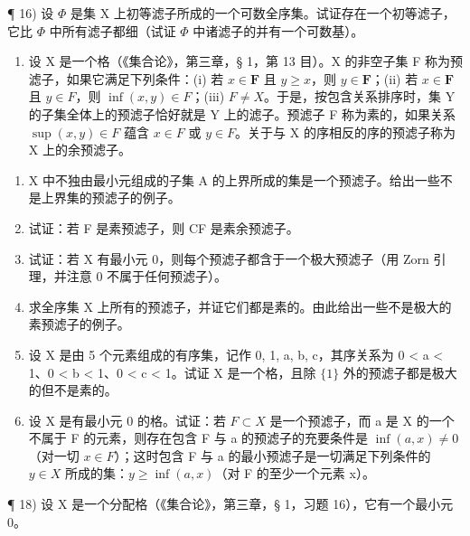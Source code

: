 ¶ 16) 设 \(\Phi\) 是集 X 上初等滤子所成的一个可数全序集。试证存在一个初等滤子，它比 \(\Phi\) 中所有滤子都细（试证 \(\Phi\) 中诸滤子的并有一个可数基）。

\begin{enumerate}
\def\labelenumi{\arabic{enumi})}
\setcounter{enumi}{16}
\tightlist
\item
  设 X 是一个格（《集合论》，第三章，§ 1，第 13 目）。X 的非空子集 F 称为预滤子，如果它满足下列条件：(i) 若 \(x \in \mathbf{F}\) 且 \(y \geqslant x\)，则 \(y \in \mathbf{F}\)；(ii) 若 \(x \in \mathbf{F}\) 且 \(y \in F\)，则 \(\inf (x, y) \in F\)；(iii) \(F \neq X\)。于是，按包含关系排序时，集 Y 的子集全体上的预滤子恰好就是 Y 上的滤子。预滤子 F 称为素的，如果关系 \(\sup(x, y) \in F\) 蕴含 \(x \in F\) 或 \(y \in F\)。关于与 X 的序相反的序的预滤子称为 X 上的余预滤子。
\end{enumerate}

\begin{enumerate}
\def\labelenumi{\alph{enumi})}
\item
  X 中不独由最小元组成的子集 A 的上界所成的集是一个预滤子。给出一些不是上界集的预滤子的例子。
\item
  试证：若 F 是素预滤子，则 CF 是素余预滤子。
\item
  试证：若 X 有最小元 0，则每个预滤子都含于一个极大预滤子（用 Zorn 引理，并注意 0 不属于任何预滤子）。
\item
  求全序集 X 上所有的预滤子，并证它们都是素的。由此给出一些不是极大的素预滤子的例子。
\item
  设 X 是由 5 个元素组成的有序集，记作 0, 1, a, b, c，其序关系为 0 \textless{} a \textless{} 1、0 \textless{} b \textless{} 1、0 \textless{} c \textless{} 1。试证 X 是一个格，且除 \(\{1\}\) 外的预滤子都是极大的但不是素的。
\item
  设 X 是有最小元 0 的格。试证：若 \(F \subset X\) 是一个预滤子，而 a 是 X 的一个不属于 F 的元素，则存在包含 F 与 a 的预滤子的充要条件是 \(\inf (a, x) \neq 0\)（对一切 \(x \in F\)）；这时包含 F 与 a 的最小预滤子是一切满足下列条件的 \(y \in X\) 所成的集：\(y \geqslant \inf (a, x)\)（对 F 的至少一个元素 x）。
\end{enumerate}

¶ 18) 设 X 是一个分配格（《集合论》，第三章，§ 1，习题 16），它有一个最小元 0。

